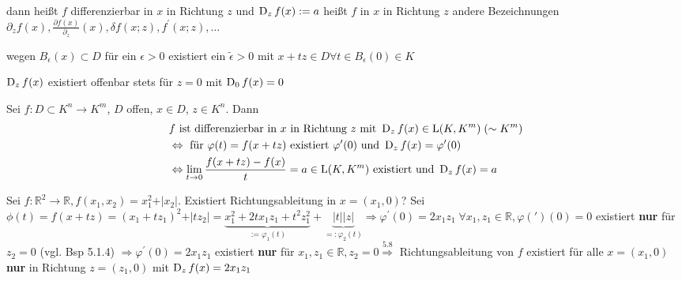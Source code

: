 dann heißt $f$ differenzierbar in $x$ in Richtung $z$ und $\operatorname{D}_z f(x):= a$ heißt  $f$ in $x$ in Richtung $z$ andere Bezeichnungen $\partial_z f(x), \frac{\partial f(x)}{\partial_z}(x), \delta f(x;z), f^{'}(x;z), \dots$

\begin{bemerkung}
    \begin{compactitem}
        \item wegen $B_{\epsilon}(x) \subset D$ für ein $\epsilon > 0$ existiert ein $\tilde{\epsilon} > 0$ mit $x+tz \in D \forall t \in B_{\epsilon}(0) \in K$
        \item $\operatorname{D}_z f(x)$ existiert offenbar stets für $z=0$ mit $\operatorname{D}_0 f(x) = 0$
    \end{compactitem}
\end{bemerkung}

\begin{folgerung}
    Sei $f: D \subset K^n \to K^m$, $D$ offen, $x\in D$, $z \in K^n$. Dann
    \begin{align} %
    &f \text{ ist differenzierbar in } x \text{ in Richtung } z \text{ mit } \Diff_z f(x) \in \LinAbb(K, K^m)\;(\sim K^m)\\
    &\Leftrightarrow \text{ für } \varphi(t) = f(x + tz) \text{ existiert } \varphi^{\prime}(0) \text{ und } \Diff_z f(x) = \varphi^{\prime}(0)\\
    &\Leftrightarrow \lim_{t \to 0} \frac{f(x + tz) - f(x)}{t} = a \in \LinAbb(K,K^m) \text{ existiert und } \Diff_z f(x) = a
    \end{align}
\end{folgerung}

\begin{beispiel}
    Sei $f: \mathbb{R}^2 \to \mathbb{R}, f(x_1,x_2) = x_1^2 + \vert x_2\vert$. Existiert Richtungsableitung in $x=(x_1,0)$? Sei $\phi(t) = f(x + tz) = (x_1 + tz_1)^2 + \vert tz_2\vert = \underbrace{x_1^2 + 2tx_1 z_1 +  t^2 z_1^2}_{:= \varphi_1(t)} + \underbrace{\vert t \vert \vert z \vert}_{=: \varphi_2(t)} \Rightarrow \varphi^{\prime}(0) = 2x_1z_1\;\forall x_1, z_1 \in \mathbb{R}, \varphi(\prime)(0) = 0$ existiert \textbf{nur} für $z_2 = 0$ (vgl. Bsp 5.1.4) %
    $\Rightarrow \varphi^{\prime}(0) = 2x_1 z_1$ existiert \textbf{nur} für $x_1, z_1 \in \mathbb{R}, z_2 = 0 \overset{5.8}{\Rightarrow}$ Richtungsableitung von $f$ existiert für alle $x=(x_1,0)$ \textbf{nur} in Richtung $z=(z_1,0)$ mit $\operatorname{D}_z f(x) = 2x_1 z_1$
\end{beispiel}

